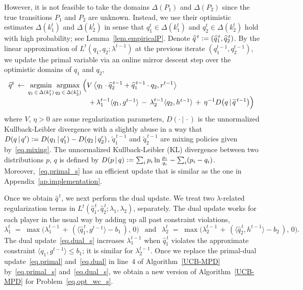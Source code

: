 \documentclass[12pt, final]{l4dc2023}
\begin{document}
However, it is not feasible to take the domains $\Delta(P_1)$ and $\Delta(P_2)$ since the true transitions $P_1$ and $P_2$ are unknown. Instead, we use their optimistic estimates $\Delta(k_1^t)$ and $\Delta(k_2^t)$ in sense that $q_1^t\in \Delta(k_1^t)$ and $q_2^t\in \Delta(k_2^t)$ hold with high probability; see Lemma~\ref{lem.empiricalP}. Denote $\widehat q^{\,t} \mathrel{\mathop:}= (\widehat q_1^{\,t},\widehat q_2^{\,t})$. By the linear approximation of $L^t(q_1,q_2;\lambda^{t-1})$ at the previous iterate $(q_1^{t-1},q_2^{t-1})$, we update the primal variable via an online mirror descent step over the optimistic domains of $q_1$ and $q_2$,
\begin{equation}\label{eq.primal_s}
\begin{array}{rcl}
&&  \!\!\!\! \!\!\!\! \!\!\!\! \!\!
\hat q^t 
\,\leftarrow\,
\displaystyle \argmin_{q_1\,\in\,\Delta(k_1^t)} \argmax_{q_2\,\in\,\Delta(k_2^t)} 
\Big(
V\, 
\big\langle{q_1\cdot \hat q_2^{\,t-1}+\hat q_1^{\,t-1}\cdot q_2},{r^{t-1}}\big\rangle 
\\[0.2cm]
&& \;\;\;\;  \;\;\;\;  \;\;\;\;  \;\;\;\;  \;\;\;\;  \;\;\;\;  \;\;\;\;  \;\;\;\;
\,+\,
\lambda_1^{t-1}\langle{q_1},{g^{t-1}}\rangle 
\, -\, 
\lambda_2^{t-1}\langle{q_2},{h^{t-1}}\rangle
\, +\, 
\displaystyle \eta^{-1} D\big(q\,\vert\,  \tilde{q}^{\,t-1}\big)\Big)
\end{array}
\end{equation}
where $V$, $\eta>0$ are some regularization parameters, $D(\cdot\,\vert\,\cdot)$ is the unnormalized Kullback-Leibler divergence with a slightly abuse in a way that $D(q\,\vert\,q') \mathrel{\mathop:}= D(q_1\,\vert\,q_1')-D(q_2\,\vert\,q_2')$, $\tilde{q}_1^{\,t-1}$ and $\tilde{q}_2^{\,t-1}$ are mixing policies given by~\eqref{eq.mixing}.
The unnormalized Kullback-Leibler (KL) divergence between two distributions $p$, $q$ is defined by $D(p\,\vert\,q) \mathrel{\mathop:}= \sum_{i} p_i \ln\frac{p_i}{q_i} - \sum_{i} (p_i-q_i)$. Moreover,~\eqref{eq.primal_s} has an efficient update that is similar as the one in Appendix~\ref{ap.implementation}. 

Once we obtain $\hat q^{\,t}$, we next perform the dual update. We treat two $\lambda$-related regularization terms in $L^t(\hat q_1^{\,t}, \hat q_2^{\,t};\lambda_1,\lambda_2)$, separately. The dual update works for each player in the usual way by adding up all past constraint violations,
\begin{equation}\label{eq.dual_s}
\lambda_1^{t} \;=\; \max \big( \lambda_1^{t-1} \,+\, (\langle{\hat q_1^{\,t}},{g^{t-1}}\rangle -b_1\, ),\, 0 \big)
\;\, \text{ and } \;\,
\lambda_2^{t} \;=\; \max \big( \lambda_2^{t-1} \,+\, (\langle{\hat q_2^{\,t}},{h^{t-1}}\rangle-b_2\, ),\, 0 \big).
\end{equation}
The dual update~\eqref{eq.dual_s} increases $\lambda_1^{t-1}$ when $\hat q_1^{\,t}$ violates the approximate constraint $\langle{q_1},{g^{t-1}}\rangle \leq b_1$; it is similar for $\lambda_2^{t-1}$. Once we replace the primal-dual update~\eqref{eq.primal} and~\eqref{eq.dual} in line~4 of Algorithm~\ref{UCB-MPD} by~\eqref{eq.primal_s} and~\eqref{eq.dual_s}, we obtain a new version of Algorithm~\ref{UCB-MPD} for Problem~\eqref{eq.opt_wc_s}. 
\end{document}
